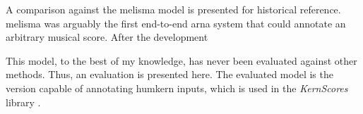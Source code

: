 
A comparison against the \gls{melisma} model is presented
for historical reference. \gls{melisma} was arguably the
first end-to-end \gls{arna} system that could annotate an
arbitrary musical score. After the development

This model, to the best of my
knowledge, has never been evaluated against other methods.
Thus, an evaluation is presented here. The evaluated model
is the version capable of annotating \gls{humkern} inputs,
which is used in the \emph{KernScores} library
\parencite{sapp2005online}.
